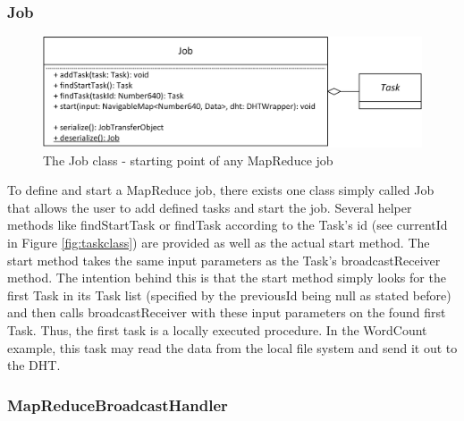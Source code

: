 \subsubsection{Job}
\begin{figure}
	\centering	
	\includegraphics{imgs/jobtask}
	\caption{The Job class - starting point of any MapReduce job}	
	\label{fig:jobtask}
\end{figure} 
To define and start a MapReduce job, there exists one class simply called Job that allows the user to add defined tasks and start the job. Several helper methods like findStartTask or findTask according to the Task's id (see currentId in Figure \ref{fig:taskclass}) are provided as well as the actual start method. The start method takes the same input parameters as the Task's broadcastReceiver method. The intention behind this is that the start method simply looks for the first Task in its Task list (specified by the previousId being null as stated before) and then calls broadcastReceiver with these input parameters on the found first Task. Thus, the first task is a locally executed procedure. In the WordCount example, this task may read the data from the local file system and send it out to the DHT. 


\subsubsection{MapReduceBroadcastHandler}

